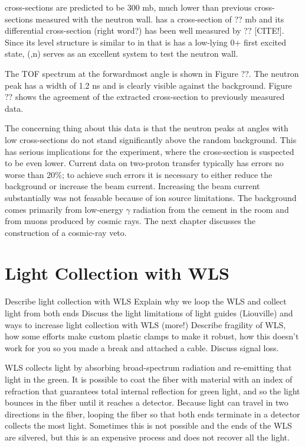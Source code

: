 \GeTargets cross-sections are predicted to be 300 mb, much lower than previous cross-sections measured with the neutron wall.   has a cross-section of ?? mb and its differential cross-section (right word?) has been well measured by ?? [CITE!].  Since its level structure is similar to \GeTargets in that is has a low-lying 0+ first excited state, (,n) serves as an excellent system to test the neutron wall.


The TOF spectrum at the forwardmost angle is shown in Figure ??.  The neutron peak has a width of 1.2 ns and is clearly visible against the background.  Figure ?? shows the agreement of the extracted cross-section to previously measured data.



The concerning thing about this data is that the neutron peaks at angles with low cross-sections do not stand significantly above the random background.  This has serious implications for the \GeTargets experiment, where the cross-section is suspected to be even lower.  Current data on two-proton transfer typically has errors no worse than 20\%; to achieve such errors it is necessary to either reduce the background or increase the beam current.  Increasing the beam current substantially was not feasable because of ion source limitations.  The background comes primarily from low-energy $\gamma$ radiation from the cement in the room and from muons produced by cosmic rays.  The next chapter discusses the construction of a cosmic-ray veto.

\section{Light Collection with WLS}
Describe light collection with WLS
Explain why we loop the WLS and collect light from both ends
Discuss the light limitations of light guides (Liouville) and ways to increase light collection with WLS (more!)
Describe fragility of WLS, how some efforts make custom plastic clamps to make it robust, how this doesn't work for you so you made a break and attached a cable.  Discuss signal loss.

WLS collects light by absorbing broad-spectrum radiation and re-emitting that light in the green.  It is possible to coat the fiber with material with an index of refraction that guarantees total internal reflection for green light, and so the light bounces in the fiber until it reaches a detector.  Because light can travel in two directions in the fiber, looping the fiber so that both ends terminate in a detector collects the most light.  Sometimes this is not possible and the ends of the WLS are silvered, but this is an expensive process and does not recover all the light. 

